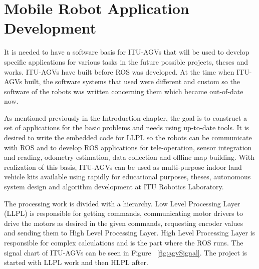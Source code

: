 
\chapter{Mobile Robot Application Development}
\label{chap:app dev}
It is needed to have a software basis for ITU-AGVs that will be used to develop specific applications for various tasks in the future possible projects, theses and works. ITU-AGVs have built before ROS was developed. At the time when ITU-AGVs built, the software systems that used were different and custom so the software of the robots was written concerning them which became out-of-date now.
\par 
As mentioned previously in the Introduction chapter, the goal is to construct a set of applications for the basic problems and needs using up-to-date tools. It is desired to write the embedded code for LLPL so the robots can be communicate with ROS and to develop ROS applications for tele-operation, sensor integration and reading, odometry estimation, data collection and offline map building. With realization of this basis, ITU-AGVs can be used as multi-purpose indoor land vehicle kits available using rapidly for educational purposes, theses, autonomous system design and algorithm development at ITU Robotics Laboratory.
\par
The processing work is divided with a hierarchy. Low Level Processing Layer (LLPL) is responsible for getting commands, communicating motor drivers to drive the motors as desired in the given commands, requesting encoder values and sending them to High Level Processing Layer. High Level Processing Layer is responsible for complex calculations and is the part where the ROS runs. The signal chart of ITU-AGVs can be seen in Figure ~\ref{fig:agvSignal}. The project is started with LLPL work and then HLPL after. 

